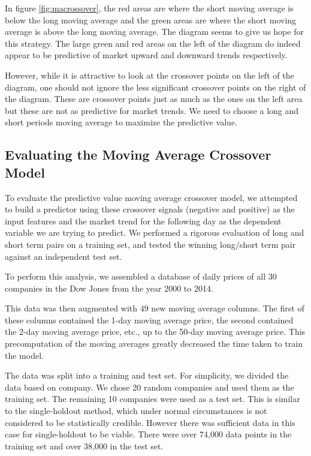 \documentclass{report}
\begin{document}
In figure \ref{fig:macrossover}, the red areas are where the short moving average is below the long moving average and the green areas are where the short moving average is above the long moving average. The diagram seems to give us hope for this strategy. The large green and red areas on the left of the diagram do indeed appear to be predictive of market upward and downward trends respectively. 

However, while it is attractive to look at the crossover points on the left of the diagram, one should not ignore the less significant crossover points on the right of the diagram. These are crossover points just as much as the ones on the left area but these are not as predictive for market trends. We need to choose a long and short periods moving average to maximize the predictive value.

\subsection{Evaluating the Moving Average Crossover Model}

To evaluate the predictive value moving average crossover model, we attempted to build a predictor using these crossover signals (negative and positive) as the input features and the market trend for the following day as the dependent variable we are trying to predict. We performed a rigorous evaluation of long and short term pairs on a training set, and tested the winning long/short term pair against an independent test set.

To perform this analysis, we assembled a database of daily prices of all 30 companies in the Dow Jones from the year 2000 to 2014.

This data was then augmented with $49$ new moving average columns. The first of these columns contained the 1-day moving average price, the second contained the 2-day moving average price, etc., up to the 50-day moving average price. This precomputation of the moving averages greatly decreased the time taken to train the model.

The data was split into a training and test set. For simplicity, we divided the data based on company. We chose 20 random companies and used them as the training set. The remaining 10 companies were used as a test set. This is similar to the single-holdout method, which under normal circumstances is not considered to be statistically credible. However there was sufficient data in this case for single-holdout to be viable. There were over 74,000 data points in the training set and over 38,000 in the test set.
\end{document}
